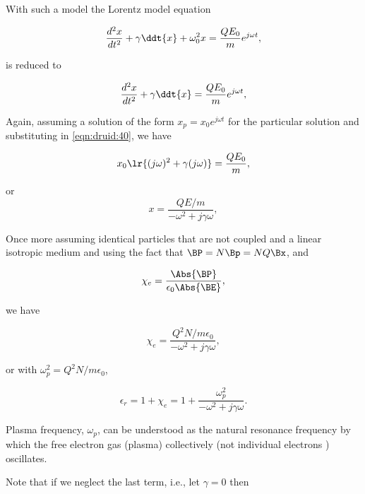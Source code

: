 With such a model the Lorentz model equation

\begin{dmath}\label{eqn:druid:20}
\frac{d^2 x}{dt^2} + \gamma \ddt{x} + \omega_0^2 x = \frac{Q E_0}{m} e^{j \omega t},
\end{dmath}

is reduced to

\begin{dmath}\label{eqn:druid:40}
\frac{d^2 x}{dt^2} + \gamma \ddt{x} = \frac{Q E_0}{m} e^{j \omega t},
\end{dmath}

Again, assuming a solution of the form \( x_p = x_0 e^{j \omega t} \) for the particular solution and substituting in \cref{eqn:druid:40}, we have

\begin{dmath}\label{eqn:druid:80}
x_0 \lr{ (j\omega)^2 + \gamma (j \omega)} = \frac{Q E_0}{m},
\end{dmath}

or
\begin{dmath}\label{eqn:druid:60}
x
=
\frac{Q E/m}{-\omega^2 + j \gamma \omega },
\end{dmath}

Once more assuming identical particles that are not coupled and a linear isotropic medium and using the fact that \( \BP = N \Bp = N Q \Bx \), and

\begin{dmath}\label{eqn:druid:100}
\chi_e = \frac{\Abs{\BP}}{\epsilon_0 \Abs{\BE} },
\end{dmath}

we have

\begin{dmath}\label{eqn:druid:120}
\chi_e
=
\frac{Q^2 N/m \epsilon_0}{-\omega^2 + j \gamma \omega },
\end{dmath}

or with \( \omega_p^2 = Q^2 N/m\epsilon_0\),

\begin{dmath}\label{eqn:druid:140}
\epsilon_r
= 1 + \chi_e
=
1+
\frac{\omega_p^2}{-\omega^2 + j \gamma \omega }.
\end{dmath}

Plasma frequency, \( \omega_p \), can be understood as the natural resonance frequency by which the free electron gas (plasma) collectively (not individual electrons ) oscillates.

Note that if we neglect the last term, i.e., let \( \gamma = 0 \) then

